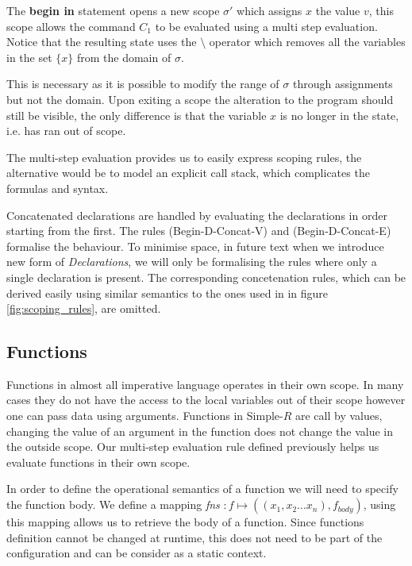 \documentclass[a4paper,12pt]{report}
\begin{document}
\par
The \textbf{begin in} statement opens a new scope $\sigma'$ which 
assigns $x$ the value $v$, this scope allows the command $C_1$ to be evaluated 
using a multi step evaluation. Notice that the resulting state 
uses the $\setminus$ operator which removes all the variables 
in the set $\{x\}$ from the domain of $\sigma$. 

\par
This is necessary as it is possible to modify the range of $\sigma$ through 
assignments but not the domain. Upon exiting a scope the alteration to the program 
should still be visible, the only difference is that the variable $x$ is no longer in 
the state, i.e. has ran out of scope.

\par
The multi-step evaluation provides us to easily express scoping rules, 
the alternative would be to model an explicit call stack, which complicates the 
formulas and syntax.

\par
Concatenated declarations are handled by evaluating the declarations in order 
starting from the first. The rules (Begin-D-Concat-V) and (Begin-D-Concat-E) 
formalise the behaviour. To minimise space, in future text when we 
introduce new form of \textit{Declarations}, we will only 
be formalising the rules where only a single declaration is present. The 
corresponding concetenation rules, which can be derived easily using  
similar semantics to the ones used in in figure \ref{fig:scoping_rules}, 
are omitted.

\subsection{Functions} \label{section:functions_sos}
Functions in almost all imperative language operates in their own scope. In many 
cases they do not have the access to the local variables out of their scope however 
one can pass data using arguments. Functions in Simple-$R$ are call by values, 
changing the value of an argument in the function does not change the value in 
the outside scope. Our multi-step evaluation rule defined previously helps us 
evaluate functions in their own scope. 

\par
In order to define the operational semantics of a function we will need to 
specify the function body. We define a mapping 
\textit{fns} $: f \mapsto ((x_1, x_2...x_n), f_{body})$, 
using this mapping allows us to retrieve the body of a function. Since functions 
definition cannot be changed at runtime, this does not need to be part of the 
configuration and can be consider as a static context.
\end{document}
